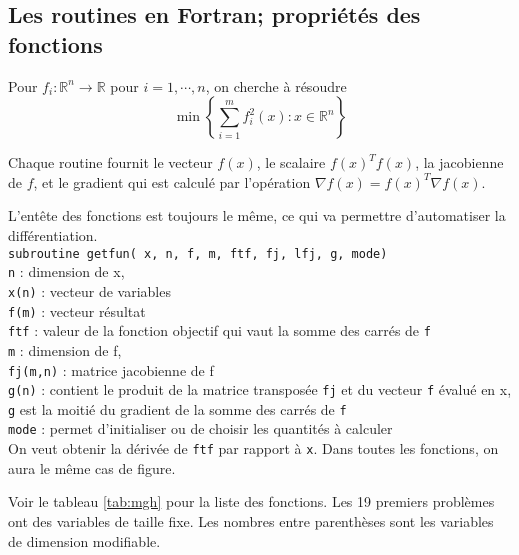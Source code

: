 \subsection{Les routines en Fortran; propri\'et\'es des fonctions}


Pour $f_i : \mathbb{R}^n \rightarrow \mathbb{R}$ pour $i=1, \cdots ,n$, on cherche \`a r\'esoudre 
$$\min \left\{\sum_{i=1}^{m}f_i^2(x):x \in \mathbb{R}^n \right\} $$

Chaque routine fournit le vecteur $f(x)$, le scalaire $f(x)^Tf(x)$, la jacobienne de $f$, et le gradient qui est calcul\'e par
l'op\'eration $ \nabla f(x)=f(x)^T\nabla f(x)$.



L'entête des fonctions est toujours le même, ce qui va permettre d'automatiser la diff\'erentiation.\\
{\center\tt subroutine getfun( x, n, f, m, ftf, fj, lfj, g, mode)}\\
{\tt n} : dimension de x, \\
{\tt x(n)} : vecteur de variables\\
{\tt f(m)} : vecteur r\'esultat \\
{\tt ftf} : valeur de la fonction objectif qui vaut la somme des carr\'es de {\tt f}\\
{\tt m} : dimension de f, \\
{\tt fj(m,n)} : matrice jacobienne de f\\
{\tt g(n)} : contient le produit de la matrice transpos\'ee {\tt fj} et du vecteur {\tt f} \'evalu\'e en x,
{\tt g} est la moiti\'e du gradient de la somme des carr\'es de {\tt f}\\
{\tt mode} : permet d'initialiser ou de choisir les quantit\'es \`a calculer\\


On veut obtenir la d\'eriv\'ee de {\tt ftf} par rapport \`a {\tt x}. Dans toutes les fonctions, on aura le même cas de figure.




Voir le tableau \ref{tab:mgh} pour la liste des fonctions. Les 19 premiers probl\`emes ont des variables de taille fixe. Les nombres
entre parenth\`eses sont les variables de dimension modifiable.


